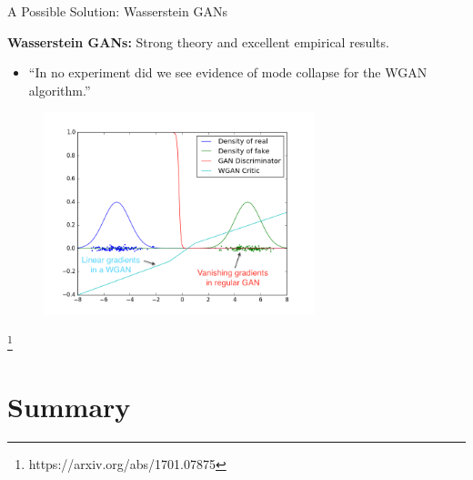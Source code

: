 \documentclass[notheorems]{beamer}
\newcommand{\source}[1]{{\let\thefootnote\relax\footnote{{\tiny #1}}}}
\begin{document}
    \begin{frame}{A Possible Solution: Wasserstein GANs}

        \textbf{Wasserstein GANs:} Strong theory and excellent empirical results.
        \vspace{-0.6cm}
        \begin{itemize}
            \item ``In no experiment did we see evidence of mode collapse for the WGAN algorithm.'' \cite{arjovsky2017wasserstein}
        \end{itemize}
        \vspace{-0.2cm}
        \begin{figure}
            \centering
            \includegraphics[width=0.7\textwidth]{figures/wasserstein}
        \end{figure}
        \vspace{-0.5cm}
        \source{https://arxiv.org/abs/1701.07875}

    \end{frame}

    \section{Summary}
\end{document}
